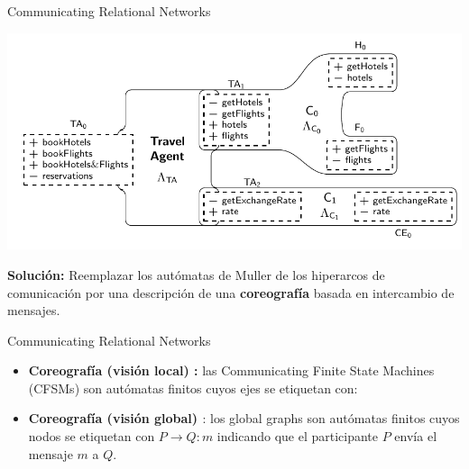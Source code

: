 \documentclass[10pt,xcolor={table,dvipsnames},t]{beamer}
\begin{document}
\begin{frame}{Communicating Relational Networks\cite{vissani:places15}}
 \vspace{\fill}
\begin{center}
    \includegraphics[scale=0.5]{images/ARN0.png}
\end{center}
 \vspace{\fill}
\textbf{Solución:} Reemplazar los autómatas de Muller de los hiperarcos de comunicación por una descripción de una \textbf{coreografía} basada en intercambio de mensajes.
 \vspace{\fill}
\end{frame}


\begin{frame}{Communicating Relational Networks}
\vspace{\fill}
\begin{itemize}
    \item \textbf{Coreografía (visión local) \cite{brand:jacm-30_2}:} las Communicating Finite State Machines (CFSMs)  son autómatas finitos cuyos ejes se etiquetan con:  
    \item \textbf{Coreografía (visión global) \cite{denielou:esop12}}: los global graphs son autómatas finitos cuyos nodos se etiquetan con $P \rightarrow Q:m$ indicando que el participante $P$ envía el mensaje $m$ a $Q$.
\end{itemize}
 \vspace{\fill}
\end{frame}
\end{document}
